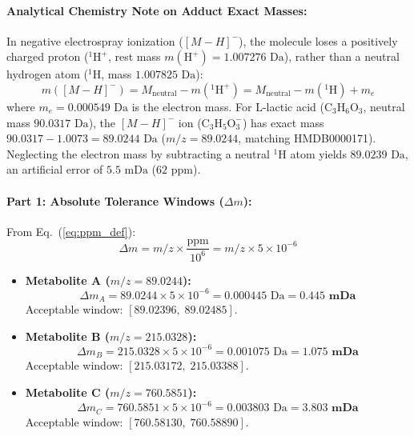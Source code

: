 \documentclass[11pt,twoside,openright]{book}
\begin{document}
\paragraph{Analytical Chemistry Note on Adduct Exact Masses:}
In negative electrospray ionization ($[M-H]^-$), the molecule loses a positively charged proton ($^1\text{H}^+$, rest mass $m(\text{H}^+) = 1.007276\text{ Da}$), rather than a neutral hydrogen atom ($^1\text{H}$, mass $1.007825\text{ Da}$):
\begin{equation*}
m([M-H]^-) = M_{\text{neutral}} - m(^1\text{H}^+) = M_{\text{neutral}} - m(^1\text{H}) + m_e
\end{equation*}
where $m_e = 0.000549\text{ Da}$ is the electron mass. For L-lactic acid ($\text{C}_3\text{H}_6\text{O}_3$, neutral mass $90.0317\text{ Da}$), the $[M-H]^-$ ion ($\text{C}_3\text{H}_5\text{O}_3^-$) has exact mass $90.0317 - 1.0073 = 89.0244\text{ Da}$ ($m/z = 89.0244$, matching HMDB0000171). Neglecting the electron mass by subtracting a neutral $^1\text{H}$ atom yields $89.0239\text{ Da}$, an artificial error of $5.5\text{ mDa}$ ($62\text{ ppm}$).

\paragraph{Part 1: Absolute Tolerance Windows ($\Delta m$):}
From Eq.~(\ref{eq:ppm_def}):
\begin{equation*}
\Delta m = m/z \times \frac{\text{ppm}}{10^6} = m/z \times 5 \times 10^{-6}
\end{equation*}
\begin{itemize}
    \item \textbf{Metabolite A ($m/z = 89.0244$):}
    \begin{equation*}
    \Delta m_A = 89.0244 \times 5 \times 10^{-6} = 0.000445\text{ Da} = \mathbf{0.445\text{ mDa}}
    \end{equation*}
    Acceptable window: $[89.02396, \; 89.02485]$.
    \item \textbf{Metabolite B ($m/z = 215.0328$):}
    \begin{equation*}
    \Delta m_B = 215.0328 \times 5 \times 10^{-6} = 0.001075\text{ Da} = \mathbf{1.075\text{ mDa}}
    \end{equation*}
    Acceptable window: $[215.03172, \; 215.03388]$.
    \item \textbf{Metabolite C ($m/z = 760.5851$):}
    \begin{equation*}
    \Delta m_C = 760.5851 \times 5 \times 10^{-6} = 0.003803\text{ Da} = \mathbf{3.803\text{ mDa}}
    \end{equation*}
    Acceptable window: $[760.58130, \; 760.58890]$.
\end{itemize}
\end{document}
